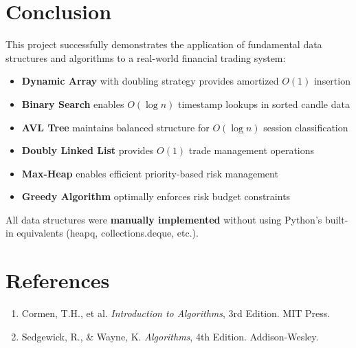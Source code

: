 \documentclass[12pt, a4paper]{article}
\begin{document}
\section{Conclusion}

This project successfully demonstrates the application of fundamental data structures and algorithms to a real-world financial trading system:

\begin{itemize}
    \item \textbf{Dynamic Array} with doubling strategy provides amortized $O(1)$ insertion
    \item \textbf{Binary Search} enables $O(\log n)$ timestamp lookups in sorted candle data
    \item \textbf{AVL Tree} maintains balanced structure for $O(\log n)$ session classification
    \item \textbf{Doubly Linked List} provides $O(1)$ trade management operations
    \item \textbf{Max-Heap} enables efficient priority-based risk management
    \item \textbf{Greedy Algorithm} optimally enforces risk budget constraints
\end{itemize}

All data structures were \textbf{manually implemented} without using Python's built-in equivalents (heapq, collections.deque, etc.).

\section{References}

\begin{enumerate}
    \item Cormen, T.H., et al. \textit{Introduction to Algorithms}, 3rd Edition. MIT Press.
    \item Sedgewick, R., \& Wayne, K. \textit{Algorithms}, 4th Edition. Addison-Wesley.
\end{enumerate}
\end{document}
